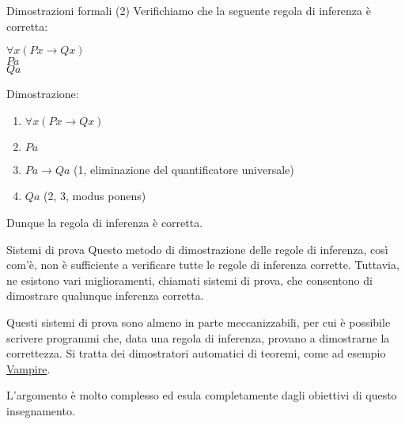 \documentclass[aspectratio=169,10pt,dvipsnames,xcolor=table,handout]{beamer}
\begin{document}
\begin{frame}{Dimostrazioni formali (2)}
    Verifichiamo che la seguente regola di inferenza è corretta:
    \begin{center}
        \begin{inference}
            $\forall x (Px \to Qx)$\\
            $Pa$\\
            \hline
            $Qa$
        \end{inference}
    \end{center}
    Dimostrazione:
    \begin{enumerate}
        \item $\forall x (Px \to Qx)$\\
        \item $Pa$\\
        \item $Pa \to Qa$ \hfill (1, eliminazione del quantificatore universale)\\
        \item $Qa$ \hfill (2, 3, modus ponens)
    \end{enumerate}
    Dunque la regola di inferenza è corretta.
\end{frame}

\begin{frame}{Sistemi di prova}
    Questo metodo di dimostrazione delle regole di inferenza, così com'è, non è sufficiente a verificare tutte le regole di inferenza corrette. Tuttavia, ne esistono vari miglioramenti, chiamati \alert{sistemi di prova}, che consentono di dimostrare qualunque inferenza corretta.

    \medskip
    Questi sistemi di prova sono almeno in parte meccanizzabili, per cui è possibile scrivere programmi che, data una regola di inferenza, provano a dimostrarne la correttezza. Si tratta dei \alert{dimostratori automatici di teoremi}, come ad esempio \href{https://vprover.github.io/}{Vampire}.

    \medskip
    L'argomento è molto complesso ed esula completamente dagli obiettivi di questo insegnamento.
\end{frame}
\end{document}
